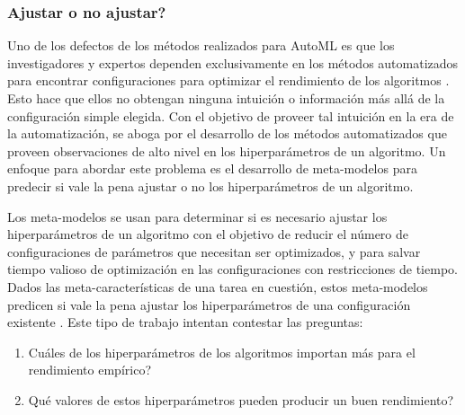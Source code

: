 \subsubsection{Ajustar o no ajustar?}


Uno de los defectos de los métodos realizados para AutoML es que los investigadores y expertos dependen exclusivamente en los métodos automatizados para encontrar configuraciones para optimizar el rendimiento de los algoritmos \cite{rijn2018hyp}. Esto hace que ellos no obtengan ninguna intuición o información más allá de la configuración simple elegida. Con el objetivo de proveer tal intuición en la era de la automatización, se aboga por el desarrollo de los métodos automatizados que proveen observaciones de alto nivel en los hiperparámetros de un algoritmo. Un enfoque para abordar este problema es el desarrollo de meta-modelos para predecir si vale la pena ajustar o no los hiperparámetros de un algoritmo.

Los meta-modelos se usan para determinar si es necesario ajustar los hiperparámetros de un algoritmo con el objetivo de reducir el número de configuraciones de parámetros que necesitan ser optimizados, y para salvar tiempo valioso de optimización en las configuraciones con restricciones de tiempo. Dados las meta-características de una tarea en cuestión, estos meta-modelos predicen si vale la pena ajustar los hiperparámetros de una configuración existente \cite{ridd2014using, rijn2018hyp}. Este tipo de trabajo intentan contestar las preguntas: 
\begin{enumerate}
	\item \textquestiondown Cuáles de los hiperparámetros de los algoritmos importan más para el rendimiento empírico?
	\item \textquestiondown Qué valores de estos hiperparámetros pueden producir un buen rendimiento?
\end{enumerate}

